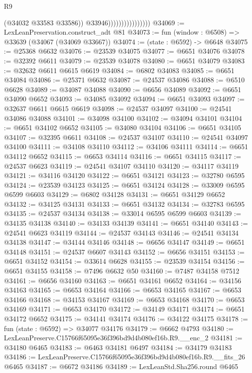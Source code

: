 \begin{lexlean}{R9}
\begin{coremodule}
                                      (@34032 @33583 @33586))
                                    @33946))))))))))))))))
@34069 := LexLeanPreservation.construct_adt @81
@34073 := fun (window : @6508) => @33639 (@34067 (@34069 @33667))
@34074 := (state : @6592) -> @6648
@34075 := @25368 @6632
@34076 := @23539 @34075
@34077 := @6651 @34076
@34078 := @32392 @6611
@34079 := @23539 @34078
@34080 := @6651 @34079
@34083 := @32632 @6611 @6615 @6619
@34084 := @6802 @34083
@34085 := @6651 @34084
@34086 := @25371 @6632
@34087 := @24537 @34086
@34088 := @6510 @6628
@34089 := @34087 @34088
@34090 := @6656 @34089
@34092 := @6651 @34090 @6652
@34093 := @34085 @34092
@34094 := @6651 @34093
@34097 := @32637 @6611 @6615 @6619
@34098 := @24537 @34097
@34100 := @24541 @34086 @34088
@34101 := @34098 @34100
@34102 := @34094 @34101
@34104 := @6651 @34102 @6652
@34105 := @34080 @34104
@34106 := @6651 @34105
@34107 := @32395 @6611
@34108 := @24537 @34107
@34110 := @24541 @34097 @34100
@34111 := @34108 @34110
@34112 := @34106 @34111
@34114 := @6651 @34112 @6652
@34115 := @6653 @34114
@34116 := @6651 @34115
@34117 := @24537 @6623
@34119 := @24541 @34107 @34110
@34120 := @34117 @34119
@34121 := @34116 @34120
@34122 := @6651 @34121
@34123 := @32780 @6595
@34124 := @23539 @34123
@34125 := @6651 @34124
@34128 := @33009 @6595 @6599 @6603
@34129 := @6802 @34128
@34131 := @6651 @34129 @6652
@34132 := @34125 @34131
@34133 := @6651 @34132
@34134 := @32783 @6595
@34135 := @24537 @34134
@34138 := @33014 @6595 @6599 @6603
@34139 := @34135 @34138
@34140 := @34133 @34139
@34141 := @6651 @34140
@34143 := @24541 @6623 @34119
@34144 := @24537 @34143
@34146 := @24541 @34134 @34138
@34147 := @34144 @34146
@34148 := @6656 @34147
@34149 := @6651 @34148
@34151 := @24537 @6607 @34143
@34152 := @6656 @34151
@34153 := @6651 @34152
@34154 := @33614 @6628
@34155 := @23539 @34154
@34156 := @6651 @34155
@34158 := @7496 @6632 @50
@34160 := @7487 @34158 @7512
@34161 := @6656 @34160
@34163 := @6651 @34161 @6652
@34164 := @34156 @34163
@34165 := @6653 @34164
@34166 := @6653 @34165
@34167 := @6653 @34166
@34168 := @34153 @34167
@34169 := @6653 @34168
@34170 := @6653 @34169
@34171 := @6653 @34170
@34172 := @34149 @34171
@34174 := @6651 @34172 @6652
@34175 := @34141 @34174
@34176 := @34122 @34175
@34178 := fun (state : @6592) => @34077 @34176
@34179 := @6662 @4793
@34180 := LexLeanPreserve.C15766f65095e36f396bd9d4b080ef16b.R9.__enc_2
@34181 := @34180 @6465
@34183 := @6463 @34181 @6497
@34184 := @34179 @34183
@34186 := LexLeanPreserve.C15766f65095e36f396bd9d4b080ef16b.R9.__fits_26 @6465
@34187 := @6672 @34186
@34189 := LexLeanStd.Sha256.round @6465

\end{coremodule}
\end{lexlean}
